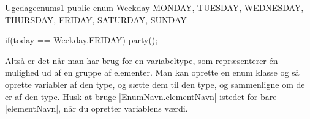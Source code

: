 \begin{JavaCode}{Ugedage}{enums1}
	public enum Weekday{
		MONDAY,
		TUESDAY,
		WEDNESDAY,
		THURSDAY,
		FRIDAY,
		SATURDAY,
		SUNDAY
	}

	if(today == Weekday.FRIDAY){
		party();
	}
\end{JavaCode}

Altså er det når man har brug for en variabeltype, som repræsenterer
én mulighed ud af en gruppe af elementer. Man kan oprette en enum
klasse og så oprette variabler af den type, og sætte dem til den type,
og sammenligne om de er af den type. Husk at bruge
\JavaInline|EnumNavn.elementNavn| istedet for bare
\JavaInline|elementNavn|, når du opretter variablens værdi.


